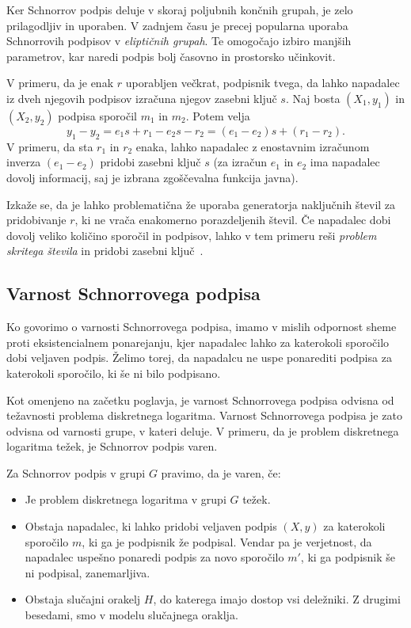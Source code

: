 \documentclass[isrm2, tisk]{fmfdelo}
\begin{document}
Ker Schnorrov podpis deluje v skoraj poljubnih končnih grupah, je zelo prilagodljiv in uporaben.
V zadnjem času je precej popularna uporaba Schnorrovih podpisov v \textit{eliptičnih grupah}.
Te omogočajo izbiro manjših parametrov, kar naredi podpis bolj časovno in prostorsko učinkovit.

\begin{opomba}
\label{opomba:nonce}
    V primeru, da je enak $r$ uporabljen večkrat, podpisnik tvega, da lahko napadalec iz dveh njegovih
    podpisov izračuna njegov zasebni ključ $s$. Naj bosta $(X_1, y_1)$ in $(X_2, y_2)$ podpisa sporočil
    $m_1$ in $m_2$. Potem velja
    $$
    y_1 - y_2 = e_1 s + r_1 - e_2 s - r_2 = (e_1 - e_2)s + (r_1 - r_2).
    $$
    V primeru, da sta $r_1$ in $r_2$ enaka, lahko napadalec z enostavnim izračunom inverza $(e_1 - e_2)$
    pridobi zasebni ključ $s$ (za izračun $e_1$ in $e_2$ ima napadalec dovolj informacij, saj je
    izbrana zgoščevalna funkcija javna).

    Izkaže se, da je lahko problematična že uporaba generatorja naključnih števil za pridobivanje
    $r$, ki ne vrača enakomerno porazdeljenih števil. Če napadalec dobi dovolj veliko količino
    sporočil in podpisov, lahko v tem primeru reši \textit{problem skritega števila} in pridobi
    zasebni ključ~\cite{tibouchi2017attacks}.
\end{opomba}

\subsection{Varnost Schnorrovega podpisa}
\label{sec:schnorr-sec}
Ko govorimo o varnosti Schnorrovega podpisa, imamo v mislih odpornost sheme proti eksistencialnem
ponarejanju, kjer napadalec lahko za katerokoli sporočilo dobi veljaven podpis. Želimo torej, da
napadalcu ne uspe ponarediti podpisa za katerokoli sporočilo, ki še ni bilo podpisano.

Kot omenjeno na začetku poglavja, je varnost Schnorrovega podpisa odvisna od težavnosti problema
diskretnega logaritma. Varnost Schnorrovega podpisa je zato odvisna od varnosti grupe, v kateri deluje.
V primeru, da je problem diskretnega logaritma težek, je Schnorrov podpis varen.

\begin{definicija}
    Za Schnorrov podpis v grupi $G$ pravimo, da je varen, če:
    \begin{itemize}
        \item Je problem diskretnega logaritma v grupi $G$ težek.
        \item Obstaja napadalec, ki lahko pridobi veljaven podpis $(X, y)$ za katerokoli sporočilo $m$,
            ki ga je podpisnik že podpisal. Vendar pa je verjetnost, da napadalec uspešno ponaredi
            podpis za novo sporočilo $m'$, ki ga podpisnik še ni podpisal, zanemarljiva.
        \item Obstaja slučajni orakelj $H$, do katerega imajo dostop vsi deležniki. Z drugimi besedami,
            smo v modelu slučajnega oraklja.
    \end{itemize}
\end{definicija}
\end{document}
